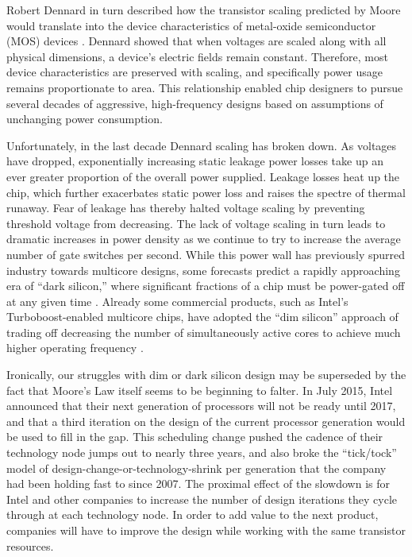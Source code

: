 Robert Dennard in turn described how the transistor scaling predicted by Moore would translate into the device characteristics of metal-oxide semiconductor (MOS) devices \cite{dennard1974design}.
Dennard showed that when voltages are scaled along with all physical dimensions, a device's electric fields remain constant.
Therefore, most device characteristics are preserved with scaling, and specifically power usage remains proportionate to area.
This relationship enabled chip designers to pursue several decades of aggressive, high-frequency designs based on assumptions of unchanging power consumption.

Unfortunately, in the last decade Dennard scaling has broken down.
As voltages have dropped, exponentially increasing static leakage power losses take up an ever greater proportion of the overall power supplied.
Leakage losses heat up the chip, which further exacerbates static power loss and raises the spectre of thermal runaway.
Fear of leakage has thereby halted voltage scaling by preventing threshold voltage from decreasing.
The lack of voltage scaling in turn leads to dramatic increases in power density as we continue to try to increase the average number of gate switches per second. 
While this power wall has previously spurred industry towards multicore designs,
some forecasts predict a rapidly approaching era of ``dark silicon,'' where significant fractions of a chip must be power-gated off at any given time \cite{esmaeilzadeh2011dark}.
Already some commercial products, such as Intel's Turboboost-enabled multicore chips, have adopted the ``dim silicon'' approach of trading off decreasing the number of simultaneously active cores to achieve much higher operating frequency \cite{wang2013implications}.

Ironically, our struggles with dim or dark silicon design may be superseded by the fact that Moore's Law itself seems to be beginning to falter.
In July 2015, Intel announced that their next generation of processors will not be ready until 2017,
and that a third iteration on the design of the current processor generation would be used to fill in the gap.
This scheduling change pushed the cadence of their technology node jumps out to nearly three years,
and also broke the ``tick/tock'' model of design-change-or-technology-shrink per generation that the company had been holding fast to since 2007.
The proximal effect of the slowdown is for Intel and other companies to increase the number of design iterations they cycle through at each technology node.
In order to add value to the next product, companies will have to improve the design while working with the same transistor resources.

